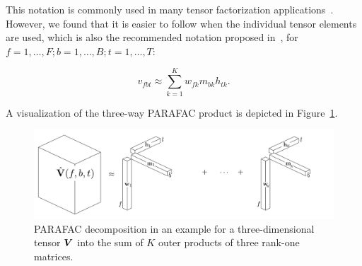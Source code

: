 This notation is commonly used in many tensor factorization applications~\cite{kolda09}.
However, we found that it is easier to follow when the individual tensor elements are used, which is also the recommended notation proposed in~\cite{kiers00}, for  $f = 1,\ldots,F; b=1,\ldots,B;t=1,\ldots,T$:

\begin{equation}
  v_{fbt} \approx \sum_{k = 1}^{K} w_{fk} m_{bk} h_{tk}.
\end{equation}

A visualization of the three-way PARAFAC product is depicted in Figure~\ref{fig:cpd}.

\begin{figure}[!t]
  \centering
  \includegraphics[width=1\textwidth]{Chapters/06_Separation_Unknown/figures/cpd.pdf}
  \caption{PARAFAC decomposition in an example for a three-dimensional tensor \({\bm{V}}\) into the sum of \(K\) outer products of three rank-one matrices.}
  \label{fig:cpd}
\end{figure}


